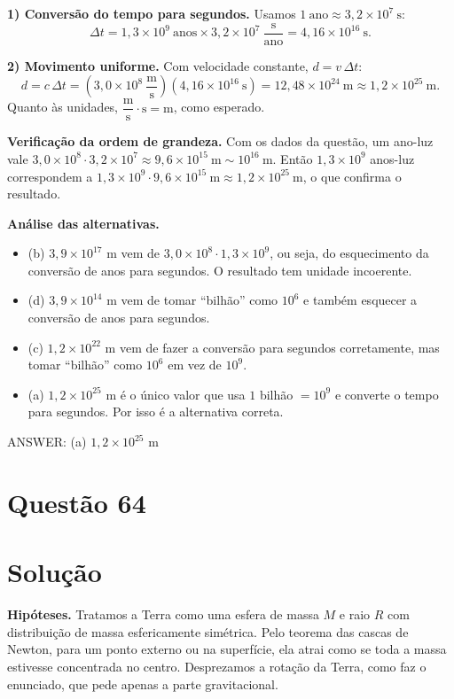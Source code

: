 \documentclass{article}%
\begin{document}
\textbf{1) Conversão do tempo para segundos.} Usamos $1\ \text{ano}\approx 3{,}2\times10^{7}\ \text{s}$:
\[
\Delta t = 1{,}3\times10^{9}\ \text{anos}\times 3{,}2\times10^{7}\ \frac{\text{s}}{\text{ano}}
= 4{,}16\times10^{16}\ \text{s}.
\]

\textbf{2) Movimento uniforme.} Com velocidade constante, $d = v\,\Delta t$:
\[
d = c\,\Delta t = \left(3{,}0\times10^{8}\ \frac{\text{m}}{\text{s}}\right)\left(4{,}16\times10^{16}\ \text{s}\right)
= 12{,}48\times10^{24}\ \text{m}\approx 1{,}2\times10^{25}\ \text{m}.
\]
Quanto às unidades, $\dfrac{\text{m}}{\text{s}}\cdot\text{s}=\text{m}$, como esperado.

\textbf{Verificação da ordem de grandeza.} Com os dados da questão, um ano-luz vale
$3{,}0\times10^{8}\cdot 3{,}2\times10^{7}\approx 9{,}6\times10^{15}\ \text{m}\sim10^{16}\ \text{m}$.
Então $1{,}3\times10^{9}$ anos-luz correspondem a
$1{,}3\times10^{9}\cdot 9{,}6\times10^{15}\ \text{m}\approx 1{,}2\times10^{25}\ \text{m}$, o que confirma o resultado.

\textbf{Análise das alternativas.}
\begin{itemize}
\item (b) $3{,}9\times10^{17}$ m vem de $3{,}0\times10^{8}\cdot1{,}3\times10^{9}$, ou seja, do esquecimento da conversão de anos para segundos. O resultado tem unidade incoerente.
\item (d) $3{,}9\times10^{14}$ m vem de tomar ``bilhão'' como $10^{6}$ e também esquecer a conversão de anos para segundos.
\item (c) $1{,}2\times10^{22}$ m vem de fazer a conversão para segundos corretamente, mas tomar ``bilhão'' como $10^{6}$ em vez de $10^{9}$.
\item (a) $1{,}2\times10^{25}$ m é o único valor que usa $1$ bilhão $=10^{9}$ e converte o tempo para segundos. Por isso é a alternativa correta.
\end{itemize}

ANSWER: (a) $1{,}2\times10^{25}$ m%
\newpage%
\section*{Questão 64}

\section*{Solução}

\textbf{Hipóteses.} Tratamos a Terra como uma esfera de massa $M$ e raio $R$ com distribuição de massa esfericamente simétrica. Pelo teorema das cascas de Newton, para um ponto externo ou na superfície, ela atrai como se toda a massa estivesse concentrada no centro. Desprezamos a rotação da Terra, como faz o enunciado, que pede apenas a parte gravitacional.
\end{document}
